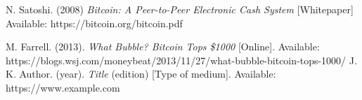 \documentclass[conference]{IEEEtran}
\begin{document}

\begin{thebibliography}{9}
	
	N. Satoshi. 
	(2008)
	\textit{Bitcoin: A Peer-to-Peer Electronic Cash System}
	[Whitepaper]
	Available: https://bitcoin.org/bitcoin.pdf

	M. Farrell. 
	(2013).	
	\textit{What Bubble? Bitcoin Tops \$1000}
	[Online].
	Available: https://blogs.wsj.com/moneybeat/2013/11/27/what-bubble-bitcoin-tops-1000/
	J. K. Author. 
	(year).	
	\textit{Title}
	(edition)
	[Type of medium].
	Available: https://www.example.com
\end{thebibliography}
\end{document}
